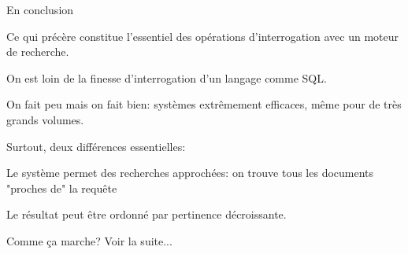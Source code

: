 


\begin{frame}[fragile]{En conclusion}


Ce qui précère constitue l'essentiel des opérations d'interrogation avec un moteur
de recherche.

  \begin{redbullet}
    \item On est loin de la finesse d'interrogation d'un langage comme SQL.
    
    \item On fait peu mais on fait bien: systèmes extrêmement efficaces, même pour
        de très grands volumes. 
  \end{redbullet}

\vfill

\alert{Surtout}, deux différences essentielles:

 \begin{redbullet}
    \item Le système permet des recherches \alert{approchées}: on trouve tous les documents "proches de" la requête
    \item Le résultat peut être \alert{ordonné} par pertinence décroissante.
  \end{redbullet}

\vfill

Comme ça marche? Voir la suite...
\end{frame}

